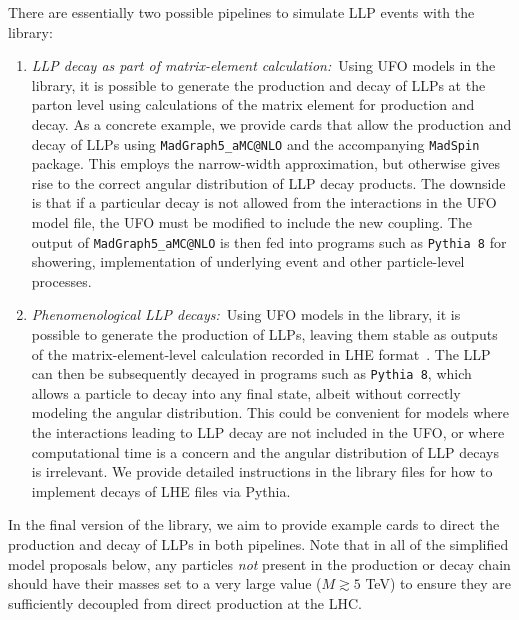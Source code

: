 There are essentially two possible pipelines to simulate LLP events with the library:
%
\begin{enumerate}

\item \emph{LLP decay as part of matrix-element calculation:}~Using UFO models in the library, it is possible to generate the production and decay of LLPs at the parton level using calculations of the matrix element for production and decay. As a concrete example, we provide cards that allow the production and decay of LLPs using \texttt{MadGraph5\_aMC@}\texttt{NLO} \cite{Alwall:2014hca} and the accompanying  \texttt{MadSpin} \cite{Artoisenet:2012st} package. This employs the narrow-width approximation, but otherwise gives rise to the correct angular distribution of LLP decay products. The downside is that if a particular decay is not allowed from the interactions in the UFO model file, the UFO must be modified to include the new coupling. The output of \texttt{MadGraph5\_aMC@}\texttt{NLO} is then fed into programs such as \texttt{Pythia 8} \cite{Sjostrand:2007gs,Sjostrand:2014zea} for showering, implementation of underlying event and other particle-level processes.

\item \emph{Phenomenological LLP decays:}~Using UFO models in the library, it is possible to generate the production of LLPs, leaving them stable as outputs of the matrix-element-level calculation recorded in LHE format~\cite{Alwall:2006yp}. The LLP can then be subsequently decayed in programs such as \texttt{Pythia 8}, which allows a particle to decay into any final state, albeit without correctly modeling the angular distribution. This could be convenient for models where the interactions leading to LLP decay are not included in the UFO, or where computational time is a concern and the angular distribution of LLP decays is irrelevant. We provide detailed instructions in the library files for how to implement decays of LHE files via Pythia.

\end{enumerate}
%
In the final version of the library, we aim to provide example cards to direct the production and decay of LLPs in both pipelines. Note that in all of the simplified model proposals below, any particles \emph{not} present in the production or decay chain should have their masses set to a very large value ($M\gtrsim5$ TeV) to ensure they are sufficiently decoupled from direct production at the LHC.


